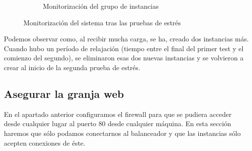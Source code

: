 \documentclass[12pt,spanish]{article}
\begin{document}
\begin{enumerate}
\begin{figure}[H]
\begin{subfigure}[t]{0.8\textwidth}
			\caption{Monitorización del grupo de instancias}
	  \end{subfigure}
		\caption{Monitorización del sistema tras las pruebas de estrés}
	\end{figure}
	Podemos observar como, al recibir mucha carga, se ha, creado dos instancias más. Cuando hubo un período de relajación (tiempo entre el final del primer test y el comienzo del segundo), se eliminaron esas dos nuevas instancias y se volvieron a crear al inicio de la segunda prueba de estrés.

\end{enumerate}
\newpage
\subsection{Asegurar la granja web}
En el apartado anterior configuramos el firewall para que se pudiera acceder desde cualquier lugar al puerto 80 desde cualquier máquina. En esta sección haremos que sólo podamos conectarnos al balanceador y que las instancias sólo acepten conexiones de éste.
\end{document}
